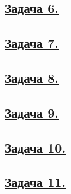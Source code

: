 \subsection*{\hyperref[sec:problem6]{Задача 6.}}\label{sec:sol_problem6}

\subsection*{\hyperref[sec:problem7]{Задача 7.}}\label{sec:sol_problem7}

\subsection*{\hyperref[sec:problem8]{Задача 8.}}\label{sec:sol_problem8}

\subsection*{\hyperref[sec:problem9]{Задача 9.}}\label{sec:sol_problem9}

\subsection*{\hyperref[sec:problem10]{Задача 10.}}\label{sec:sol_problem10}

\subsection*{\hyperref[sec:problem11]{Задача 11.}}\label{sec:sol_problem11}
